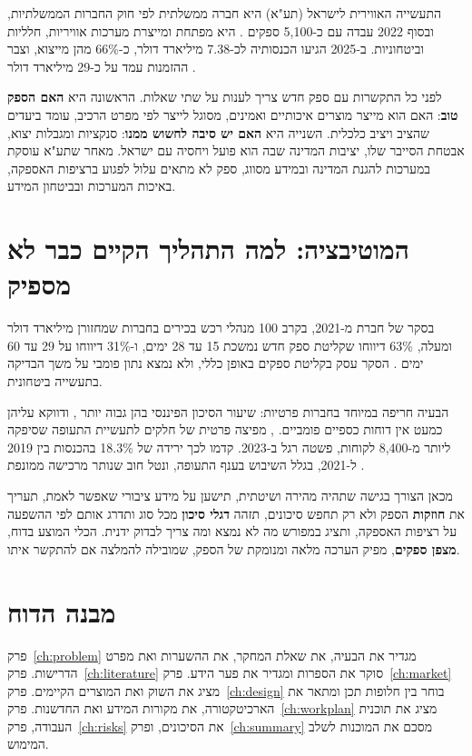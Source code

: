 התעשייה האווירית לישראל (תע"א) היא חברה ממשלתית לפי חוק החברות הממשלתיות, ובסוף 2022 עבדה עם כ-5,100 ספקים \cite{mevaker2024}. היא מפתחת ומייצרת מערכות אוויריות, חלליות וביטחוניות. ב-2025 הגיעו הכנסותיה לכ-7.38 מיליארד דולר, כ-66\% מהן מייצוא, וצבר ההזמנות עמד על כ-29 מיליארד דולר \cite{iai2026}.

לפני כל התקשרות עם ספק חדש צריך לענות על שתי שאלות. הראשונה היא \textbf{האם הספק טוב}: האם הוא מייצר מוצרים איכותיים ואמינים, מסוגל לייצר לפי מפרט הרכיב, עומד ביעדים שהציב ויציב כלכלית. השנייה היא \textbf{האם יש סיבה לחשוש ממנו}: סנקציות ומגבלות יצוא, אבטחת הסייבר שלו, יציבות המדינה שבה הוא פועל ויחסיה עם ישראל. מאחר שתע"א עוסקת במערכות להגנת המדינה ובמידע מסווג, ספק לא מתאים עלול לפגוע ברציפות האספקה, באיכות המערכות ובביטחון המידע.

\section{המוטיבציה: למה התהליך הקיים כבר לא מספיק}

בסקר של חברת  מ-2021, בקרב 100 מנהלי רכש בכירים בחברות שמחזורן מיליארד דולר ומעלה, 63\% דיווחו שקליטת ספק חדש נמשכת 15 עד 28 ימים, ו-31\% דיווחו על 29 עד 60 ימים \cite{hicx2021}. הסקר עסק בקליטת ספקים באופן כללי, ולא נמצא נתון פומבי על משך הבדיקה בתעשייה ביטחונית.

הבעיה חריפה במיוחד בחברות פרטיות: שיעור הסיכון הפיננסי בהן גבוה יותר \cite{rapidratings2026}, ודווקא עליהן כמעט אין דוחות כספיים פומביים. , מפיצה פרטית של חלקים לתעשיית התעופה שסיפקה ליותר מ-8,400 לקוחות, פשטה רגל ב-2023. קדמו לכך ירידה של 18.3\% בהכנסות בין 2019 ל-2021, בגלל השיבוש בענף התעופה, ונטל חוב שנותר מרכישה ממונפת \cite{incora2023}.

מכאן הצורך בגישה שתהיה מהירה ושיטתית, תישען על מידע ציבורי שאפשר לאמת, תעריך את \textbf{חוזקות} הספק ולא רק תחפש סיכונים, תזהה \textbf{דגלי סיכון} מכל סוג ותדרג אותם לפי ההשפעה על רציפות האספקה, ותציג במפורש מה לא נמצא ומה צריך לבדוק ידנית. הכלי המוצע בדוח, \textbf{מצפן ספקים}, מפיק הערכה מלאה ומנומקת של הספק, שמובילה להמלצה אם להתקשר איתו.

\section{מבנה הדוח}

פרק~\ref{ch:problem} מגדיר את הבעיה, את שאלת המחקר, את ההשערות ואת מפרט הדרישות. פרק~\ref{ch:literature} סוקר את הספרות ומגדיר את פער הידע. פרק~\ref{ch:market} מציג את השוק ואת המוצרים הקיימים. פרק~\ref{ch:design} בוחר בין חלופות תכן ומתאר את הארכיטקטורה, את מקורות המידע ואת החדשנות. פרק~\ref{ch:workplan} מציג את תוכנית העבודה, פרק~\ref{ch:risks} את הסיכונים, ופרק~\ref{ch:summary} מסכם את המוכנות לשלב המימוש.
